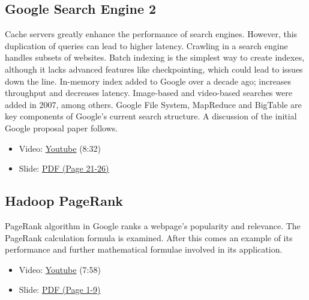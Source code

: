 \subsection{Google Search Engine 2}\label{google-search-engine-2}

Cache servers greatly enhance the performance of search engines.
However, this duplication of queries can lead to higher latency.
Crawling in a search engine handles subsets of websites. Batch indexing
is the simplest way to create indexes, although it lacks advanced
features like checkpointing, which could lead to issues down the line.
In-memory index added to Google over a decade ago; increases throughput
and decreases latency. Image-based and video-based searches were added
in 2007, among others. Google File System, MapReduce and BigTable are
key components of Google's current search structure. A discussion of the
initial Google proposal paper follows.

\begin{itemize}

\item
  Video: \href{https://www.youtube.com/watch?v=pxos3Yt6y6I}{Youtube}
  (8:32)
\end{itemize}

\begin{itemize}

\item
  Slide:
  \href{https://drive.google.com/open?id=0B88HKpainTSfYWZ0dDlrNThkVms}{PDF
  (Page 21-26)}
\end{itemize}

\subsection{Hadoop PageRank}\label{hadoop-pagerank}

PageRank algorithm in Google ranks a webpage's popularity and relevance.
The PageRank calculation formula is examined. After this comes an
example of its performance and further mathematical formulae involved in
its application.

\begin{itemize}

\item
  Video: \href{https://www.youtube.com/watch?v=GCp5OLLOrH0}{Youtube}
  (7:58)
\item
  Slide:
  \href{https://drive.google.com/open?id=0B88HKpainTSfWFpEZGxqSWRTYms}{PDF
  (Page 1-9)}
\end{itemize}

